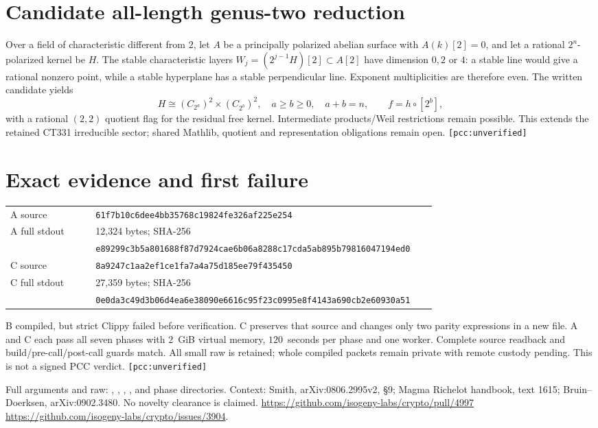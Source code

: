 \documentclass[10pt,a4paper]{article}
\begin{document}
\section{Candidate all-length genus-two reduction}
Over a field of characteristic different from $2$, let $A$ be a principally
polarized abelian surface with $A(k)[2]=0$, and let a rational $2^n$-polarized
kernel be $H$. The stable characteristic layers
$W_j=(2^{j-1}H)[2]\subset A[2]$ have dimension $0,2$ or $4$: a stable line
would give a rational nonzero point, while a stable hyperplane has a stable
perpendicular line. Exponent multiplicities are therefore even. The written
candidate yields
\[
 H\cong(C_{2^a})^2\times(C_{2^b})^2,\quad a\ge b\ge0,\quad a+b=n,\qquad f=h\circ[2^b],
\]
with a rational $(2,2)$ quotient flag for the residual free kernel.
Intermediate products/Weil restrictions remain possible. This extends the
retained CT331 irreducible sector; shared Mathlib, quotient and representation
obligations remain open. \texttt{[pcc:unverified]}

\section{Exact evidence and first failure}
\begin{tabular}{@{}p{0.19\linewidth}p{0.76\linewidth}@{}}
\toprule
A source & \texttt{61f7b10c6dee4bb35768c19824fe326af225e254}\\
A full stdout & 12,324 bytes; SHA-256\\
& \texttt{e89299c3b5a801688f87d7924cae6b06a8288c17cda5ab895b79816047194ed0}\\
C source & \texttt{8a9247c1aa2ef1ce1fa7a4a75d185ee79f435450}\\
C full stdout & 27,359 bytes; SHA-256\\
& \texttt{0e0da3c49d3b06d4ea6e38090e6616c95f23c0995e8f4143a690cb2e60930a51}\\
\bottomrule
\end{tabular}

B compiled, but strict Clippy failed before verification. C preserves that
source and changes only two parity expressions in a new file. A and C each
pass all seven phases with $2$~GiB virtual memory, $120$~seconds per phase
and one worker. Complete source readback and build/pre-call/post-call guards
match. All small raw is retained; whole compiled packets remain private
with remote custody pending. This is not a signed PCC verdict.
\texttt{[pcc:unverified]}

{\footnotesize Full arguments and raw: ,
, ,
, and phase directories. Context:
Smith, arXiv:0806.2995v2, \S9; Magma Richelot handbook, text 1615;
Bruin--Doerksen, arXiv:0902.3480. No novelty clearance is claimed.
\url{https://github.com/isogeny-labs/crypto/pull/4997} \quad
\url{https://github.com/isogeny-labs/crypto/issues/3904}.}
\end{document}
